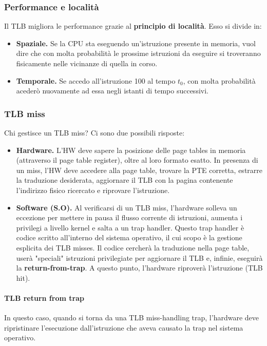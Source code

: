 \documentclass[12pt, letterpaper]{article}
\begin{document}
			\subsubsection{Performance  e località}
				Il TLB migliora le performance grazie al \textbf{principio di località}. Esso si divide in:
				\begin{itemize}
					\item \textbf{Spaziale.} Se la CPU sta eseguendo un'istruzione presente in memoria, vuol dire che con molta probabilità le prossime istruzioni da eseguire si troveranno fisicamente nelle vicinanze di quella in corso.
					\item \textbf{Temporale.} Se accedo all'istruzione 100 al tempo $t_0$, con molta probabilità acederò nuovamente ad essa negli istanti di tempo successivi. 
				\end{itemize}
			
			\subsubsection{TLB miss}
				Chi gestisce un TLB miss? Ci sono due possibili risposte:
				\begin{itemize}
					\item \textbf{Hardware.} L'HW deve sapere la posizione delle page tables in memoria (attraverso il page table register), oltre al loro formato esatto. In presenza di un miss, l'HW deve accedere alla page table, trovare la PTE corretta, estrarre la traduzione desiderata, aggiornare il TLB con la pagina contenente l'indirizzo fisico ricercato e riprovare l'istruzione.
					\item\textbf{Software (S.O).} Al verificarsi di un TLB miss, l'hardware solleva un eccezione per mettere in pausa il flusso corrente di istruzioni, aumenta i privilegi a livello kernel e salta a un trap handler. Questo trap handler è codice scritto all'interno del sistema operativo, il cui scopo è la gestione esplicita dei TLB misses. Il codice cercherà la traduzione nella page table, userà "speciali" istruzioni privilegiate per aggiornare il TLB e, infinie, eseguirà la \textbf{return-from-trap}. A questo punto, l'hardware riproverà l'istruzione (TLB hit).
				\end{itemize}
				\paragraph{TLB return from trap} In questo caso, quando si torna da una TLB miss-handling trap, l'hardware deve ripristinare l'esecuzione dall'istruzione che aveva causato la trap nel sistema operativo.
				
\end{document}
